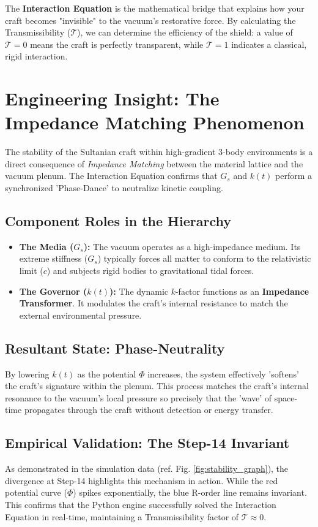 \documentclass[11pt]{article}
\begin{document}
The  \textbf{Interaction Equation} is the mathematical bridge that explains how your craft becomes "invisible" to the vacuum's restorative force. By calculating the Transmissibility ($\mathcal{T}$), we can determine the efficiency of the shield: a value of $\mathcal{T} = 0$ means the craft is perfectly transparent, while $\mathcal{T} = 1$ indicates a classical, rigid interaction.\\

\section{Engineering Insight: The Impedance Matching Phenomenon}

The stability of the Sultanian craft within high-gradient 3-body environments is a direct consequence of \textit{Impedance Matching} between the material lattice and the vacuum plenum. The Interaction Equation confirms that $G_s$ and $k(t)$ perform a synchronized 'Phase-Dance' to neutralize kinetic coupling.

\subsection{Component Roles in the Hierarchy}
\begin{itemize}
    \item \textbf{The Media ($G_s$):} The vacuum operates as a high-impedance medium. Its extreme stiffness ($G_s$) typically forces all matter to conform to the relativistic limit ($c$) and subjects rigid bodies to gravitational tidal forces.
    \item \textbf{The Governor ($k(t)$):} The dynamic $k$-factor functions as an \textbf{Impedance Transformer}. It modulates the craft's internal resistance to match the external environmental pressure.
\end{itemize}

\subsection{Resultant State: Phase-Neutrality}
By lowering $k(t)$ as the potential $\Phi$ increases, the system effectively 'softens' the craft's signature within the plenum. This process matches the craft's internal resonance to the vacuum's local pressure so precisely that the 'wave' of space-time propagates through the craft without detection or energy transfer.

\subsection{Empirical Validation: The Step-14 Invariant}
As demonstrated in the simulation data (ref. Fig. \ref{fig:stability_graph}), the divergence at Step-14 highlights this mechanism in action. While the red potential curve ($\Phi$) spikes exponentially, the blue R-order line remains invariant. This confirms that the Python engine successfully solved the Interaction Equation in real-time, maintaining a Transmissibility factor of $\mathcal{T} \approx 0$.\\
\end{document}
